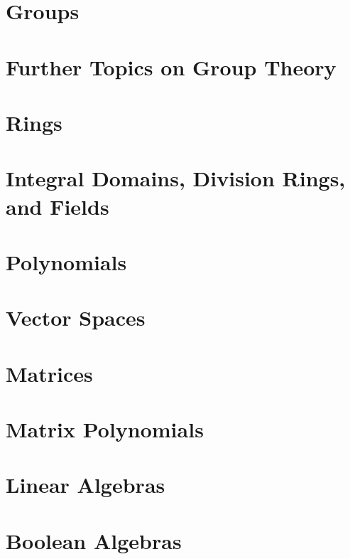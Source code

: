 \documentclass{book}
\begin{document}
\chapter{Groups}


\chapter{Further Topics on Group Theory}

\chapter{Rings}

\chapter{Integral Domains, Division Rings, and Fields}
\chapter{Polynomials}
\chapter{Vector Spaces}
\chapter{Matrices}
\chapter{Matrix Polynomials}
\chapter{Linear Algebras}
\chapter{Boolean Algebras}
\end{document}
